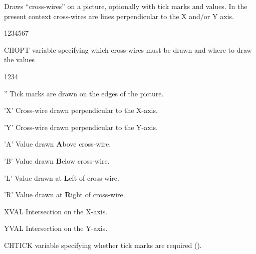 \Action
Draws ``cross-wires'' on a picture, optionally with tick marks and values. In 
the present context cross-wires are lines perpendicular to the X and/or Y axis.
\Pdesc
\begin{DLtt}{1234567}
\item[CHOPT]  \CHARACTER{} variable specifying which cross-wires must be drawn
              and where to draw the values
\begin{DLtt}{1234}
\item['']     Tick marks are drawn on the edges of the picture.
\item['X']    Cross-wire drawn perpendicular to the X-axis.
\item['Y']    Cross-wire drawn perpendicular to the Y-axis.
\item['A']    Value drawn {\bf A}bove cross-wire.
\item['B']    Value drawn {\bf B}elow cross-wire.
\item['L']    Value drawn at {\bf L}eft of cross-wire.
\item['R']    Value drawn at {\bf R}ight of cross-wire.
\end{DLtt}
\item[XVAL]   Intersection on the X-axis.
\item[YVAL]   Intersection on the Y-axis.
\item[CHTICK] \CHARACTER{} variable specifying whether tick marks are required
              ().
\end{DLtt}
\Remarks
